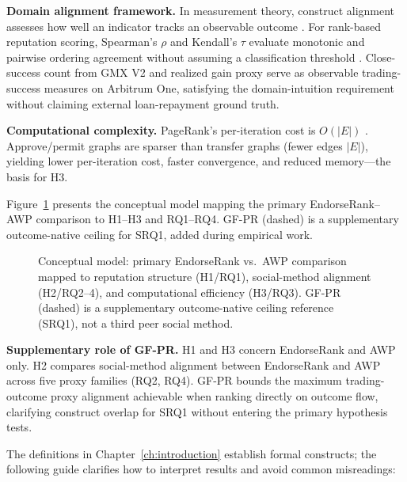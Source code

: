 \textbf{Domain alignment framework.} In measurement theory, construct alignment assesses how well an indicator tracks an observable outcome . For rank-based reputation scoring, Spearman's $\rho$ and Kendall's $\tau$ evaluate monotonic and pairwise ordering agreement without assuming a classification threshold . Close-success count from GMX V2 and realized gain proxy serve as observable trading-success measures on Arbitrum One, satisfying the domain-intuition requirement without claiming external loan-repayment ground truth.

\textbf{Computational complexity.} PageRank's per-iteration cost is $O(|E|)$ . Approve/permit graphs are sparser than transfer graphs (fewer edges $|E|$), yielding lower per-iteration cost, faster convergence, and reduced memory---the basis for H3.

Figure~\ref{fig:conceptual-model} presents the conceptual model mapping the primary EndorseRank--AWP comparison to H1--H3 and RQ1--RQ4. GF-PR (dashed) is a supplementary outcome-native ceiling for SRQ1, added during empirical work.

\begin{figure}[htbp]
\centering

\caption{Conceptual model: primary EndorseRank vs.\ AWP comparison mapped to reputation structure (H1/RQ1), social-method alignment (H2/RQ2--4), and computational efficiency (H3/RQ3). GF-PR (dashed) is a supplementary outcome-native ceiling reference (SRQ1), not a third peer social method.}
\label{fig:conceptual-model}
\end{figure}

\textbf{Supplementary role of GF-PR.} H1 and H3 concern EndorseRank and AWP only. H2 compares social-method alignment between EndorseRank and AWP across five proxy families (RQ2, RQ4). GF-PR bounds the maximum trading-outcome proxy alignment achievable when ranking directly on outcome flow, clarifying construct overlap for SRQ1 without entering the primary hypothesis tests.


The definitions in Chapter~\ref{ch:introduction} establish formal constructs; the following guide clarifies how to interpret results and avoid common misreadings:

